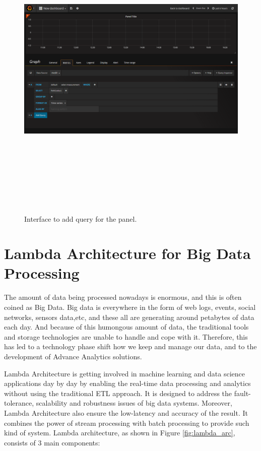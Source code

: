  \begin{figure}[htpb]
	\centering
	\includegraphics[width=16cm,height=15cm,keepaspectratio=true]{images/gr_query}
	\caption{
		Interface to add query for the panel.
	}
	\label{fig:gr_query}
\end{figure}


\section{Lambda Architecture for Big Data Processing} \label{sec:lmb_arc}
The amount of data being processed nowadays is enormous, and this is often coined as Big Data. Big data is everywhere in the form of web logs, events, social networks, sensors data,etc, and these all are generating around petabytes of data each day. And because of this humongous amount of data, the traditional tools and storage technologies are unable to handle and cope with it. Therefore, this has led to a technology phase shift how we keep and manage our data, and to the development of Advance Analytics solutions.

Lambda Architecture \cite{UBDLAH} \cite{oreillyla} \cite{7364082} \cite{maprla} is getting involved in machine learning and data science applications day by day by enabling the real-time data processing and analytics without using the traditional ETL approach. It is designed to address the fault-tolerance, scalability and robustness issues of big data systems. Moreover, Lambda Architecture also ensure the low-latency and accuracy of the result. It combines the power of stream processing with batch processing to provide such kind of system.
Lambda architecture, as shown in Figure \ref{fig:lambda_arc}, consists of 3 main components:


